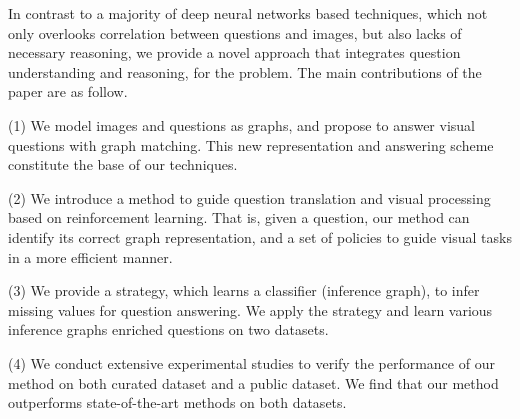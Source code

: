 \vspace{2ex}
 In contrast to a majority of deep neural networks based \vqa techniques, which not only overlooks correlation between questions and images, but also lacks of necessary reasoning, we provide a novel approach that integrates question understanding and reasoning, for the \vqa problem. The main contributions of the paper are as follow.  

(1) We model images and questions as graphs, and propose to answer visual questions with graph matching. This new representation and answering scheme constitute the base of our techniques.  

(2) We introduce a method to guide question translation and visual processing based on reinforcement learning. That is, given a question, our method can identify its correct graph representation, and a set of policies to guide visual tasks in a more efficient manner. 

(3) We provide a strategy, which learns a classifier (\aka inference graph), to infer missing values for question answering. We apply the strategy and learn various inference graphs \wrt enriched questions on two \vqa datasets.  

(4) We conduct extensive experimental studies to verify the performance of our method on both curated \vqa dataset and a public \vqa dataset. We find that our method outperforms state-of-the-art methods on both datasets.